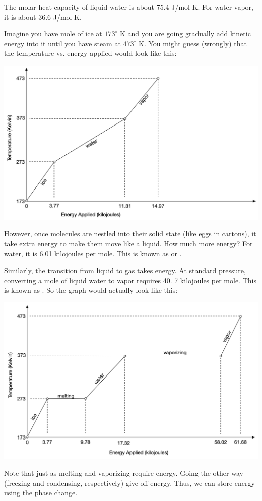 The molar heat capacity of liquid water is about 75.4 J/mol-K.  For water vapor, it is about 36.6 J/mol-K.

Imagine you have mole of ice at $173^\circ$ K  and you are going gradually add kinetic energy into it until you have steam at $473^\circ$ K.  You might guess (wrongly) that the temperature vs. energy applied would look like this:

\includegraphics[width=0.8\linewidth]{energynaive.png}

However,  once molecules are nestled into their solid state (like eggs in cartons),  it take extra energy to make them move like a liquid.  How much more energy?  For water,  it is 6.01 kilojoules per mole.  This is known as  or .

Similarly,  the transition from liquid to gas takes energy.  At standard pressure,  converting a mole of liquid water to vapor requires 40. 7 kilojoules per mole.  This is known as . So the graph would actually look like this:

\includegraphics[width=0.8\linewidth]{energysoph.png}

Note that just as melting and vaporizing require energy.   Going the other way (freezing and condensing, respectively) give off energy.    Thus, we can store energy using the phase change.

